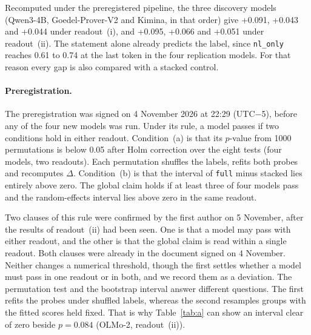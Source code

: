\documentclass[10pt]{article}
\newcommand{\vr}[1]{\texttt{#1}}
\newcommand{\D}{\Delta}
\begin{document}
Recomputed under the preregistered pipeline, the three discovery models (Qwen3-4B, Goedel-Prover-V2 and Kimina, in that order) give +0.091, +0.043 and +0.044 under
readout~(i), and +0.095, +0.066 and +0.051 under readout~(ii). The statement alone already predicts the label,
since \vr{nl\_only} reaches 0.61 to 0.74 at the last token in the four replication models. For that reason every gap is also compared
with a stacked control.

\paragraph{Preregistration.}
The preregistration was signed on 4 November 2026 at 22:29 (UTC$-$5), before any of the four new models was run.
Under its rule, a model passes if two conditions hold in either readout. Condition~(a) is that its $p$-value from
1000 permutations is below 0.05 after Holm correction \citep{holm} over the eight tests (four models, two
readouts). Each permutation shuffles the labels, refits both probes and recomputes $\D$. Condition~(b) is that the
interval of \vr{full} minus stacked lies entirely above zero. The global claim holds if at least three of four
models pass and the random-effects interval lies above zero in the same readout.

Two clauses of this rule were confirmed by the first author on 5 November, after the results of readout~(ii) had
been seen. One is that a model may pass with either readout, and the other is that the global claim is read within a
single readout.
Both clauses were already in the document signed on 4 November. Neither changes a numerical threshold, though the first settles whether a model must pass in one
readout or in both, and we record them as a deviation.
The permutation test and the bootstrap interval answer different questions. The first refits the probes under
shuffled labels, whereas the second resamples groups with the fitted scores held fixed. That is why
Table~\ref{tab:a} can show an interval clear of zero beside $p = 0.084$ (OLMo-2, readout~(ii)).
\end{document}
